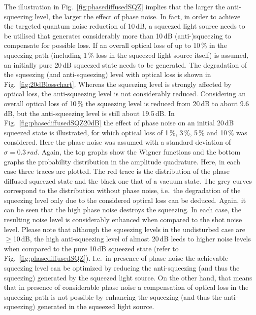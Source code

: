The illustration in Fig.~\ref{fig:phasediffusedSQZ} implies that the larger the anti-squeezing level, the larger the effect of phase noise. In fact, in order to achieve the targeted quantum noise reduction of 10\,dB, a squeezed light source needs to be utilised that generates considerably more than 10\,dB (anti-)squeezing to compensate for possible loss. If an overall optical loss of up to 10\,\% in the squeezing path (including 1\,\% loss in the squeezed light source itself) is assumed, an initially pure 20\,dB squeezed state needs to be generated. The degradation of the squeezing (and anti-squeezing) level with optical loss is shown in Fig.~\ref{fig:20dBlosschart}. Whereas the squeezing level is strongly affected by optical loss, the anti-squeezing level is not considerably reduced. Considering an overall optical loss of 10\,\% the squeezing level is reduced from 20\,dB to about 9.6\,dB, but the anti-squeezing level is still about 19.5\,dB. In Fig.~\ref{fig:phasediffusedSQZ20dB} the effect of phase noise on an initial 20\,dB squeezed state is illustrated, for which optical loss of 1\,\%, 3\,\%, 5\,\% and 10\,\% was considered. Here the phase noise was assumed with a standard deviation of $\sigma=0.3\,rad$. Again,  the top graphs show the Wigner functions and the bottom graphs the probability distribution in the amplitude quadrature. Here, in each case three traces are plotted. The red trace is the distribution of the phase diffused squeezed state and the black one that of a vacuum state. The grey curves correspond to the distribution without phase noise, i.e.\ the degradation of the squeezing level only due to the considered optical loss can be deduced. Again, it can be seen that the high phase noise destroys the squeezing. In each case, the resulting noise level is considerably enhanced when compared to the shot noise level. Please note that although the squeezing levels in the undisturbed case are $\geq$10\,dB, the high anti-squeezing level of almost 20\,dB leeds to higher noise levels when compared to the pure 10\,dB squeezed state (refer to Fig.~\ref{fig:phasediffusedSQZ}). I.e.\ in presence of phase noise the achievable squeezing level can be  optimized by reducing the anti-squeezing (and thus the squeezing) generated by the squeezed light source. On the other hand, that means that in presence of considerable phase noise a compensation of optical loss in the  squeezing path is not possible by enhancing the  squeezing (and thus the anti-squeezing) generated in the squeezed light source.

